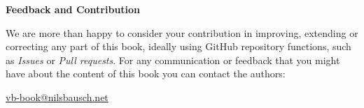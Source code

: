 {\vspace{25pt}

\noindent
{\sffamily\bfseries Feedback and Contribution}

\noindent
We are more than happy to consider your contribution in improving, extending or correcting any part of this book, ideally using GitHub repository functions, such as \emph{Issues} or \emph{Pull requests}.
For any communication or feedback that you might have about the content of this book you can contact the authors:

\noindent
\href{mailto:vb-book@nilsbausch.net}{vb-book@nilsbausch.net}

\vfill
\noindent

} %
